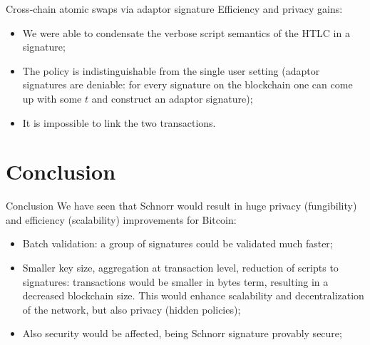 \documentclass[slidescentered]{beamer}
\begin{document}
\begin{frame}[t]
	\end{frame}

	\begin{frame}{Cross-chain atomic swaps via adaptor signature}
		Efficiency and privacy gains:
		\begin{itemize}
			\item<1-> We were able to condensate the verbose script semantics of the HTLC in a signature;
			\item<2-> The policy is indistinguishable from the single user setting (adaptor signatures are deniable: for every signature on the blockchain one can come up with some $t$ and construct an adaptor signature);
			\item<3-> It is impossible to link the two transactions.
		\end{itemize}
	\end{frame}

	\section{Conclusion}
	\begin{frame}{Conclusion}
		We have seen that Schnorr would result in huge privacy (fungibility) and efficiency (scalability) improvements for Bitcoin:
		\begin{itemize}
			\item<1->  Batch validation: a group of signatures could be validated much faster;
			\item<2-> Smaller key size, aggregation at transaction level, reduction of scripts to signatures: transactions would be smaller in bytes term, resulting in a decreased blockchain size. This would enhance scalability and decentralization of the network, but also privacy (hidden policies);
			\item<3-> Also security would be affected, being Schnorr signature provably secure;
		\end{itemize}
	
	\end{frame}
\end{document}

